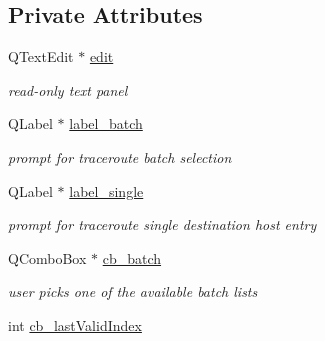 \subsection*{Private Attributes}
\begin{CompactItemize}
\item 
\hypertarget{classTraceSelectWizardPage_09f41e03b88d1b0eb7f04263587ebc3f}{
QTextEdit $\ast$ \hyperlink{classTraceSelectWizardPage_09f41e03b88d1b0eb7f04263587ebc3f}{edit}}
\label{classTraceSelectWizardPage_09f41e03b88d1b0eb7f04263587ebc3f}

\begin{CompactList}\small\item\em read-only text panel \item\end{CompactList}\item 
\hypertarget{classTraceSelectWizardPage_efc4ae411f6a3a83d13dc6b591c55ff1}{
QLabel $\ast$ \hyperlink{classTraceSelectWizardPage_efc4ae411f6a3a83d13dc6b591c55ff1}{label\_\-batch}}
\label{classTraceSelectWizardPage_efc4ae411f6a3a83d13dc6b591c55ff1}

\begin{CompactList}\small\item\em prompt for traceroute batch selection \item\end{CompactList}\item 
\hypertarget{classTraceSelectWizardPage_0e6b39a93b12ab04cec58493988f991c}{
QLabel $\ast$ \hyperlink{classTraceSelectWizardPage_0e6b39a93b12ab04cec58493988f991c}{label\_\-single}}
\label{classTraceSelectWizardPage_0e6b39a93b12ab04cec58493988f991c}

\begin{CompactList}\small\item\em prompt for traceroute single destination host entry \item\end{CompactList}\item 
\hypertarget{classTraceSelectWizardPage_4a545e13ffac35321c06b4c80dfd3cd3}{
QComboBox $\ast$ \hyperlink{classTraceSelectWizardPage_4a545e13ffac35321c06b4c80dfd3cd3}{cb\_\-batch}}
\label{classTraceSelectWizardPage_4a545e13ffac35321c06b4c80dfd3cd3}

\begin{CompactList}\small\item\em user picks one of the available batch lists \item\end{CompactList}\item 
\hypertarget{classTraceSelectWizardPage_f8655eb96839f5c311b3a69ce8800b9e}{
int \hyperlink{classTraceSelectWizardPage_f8655eb96839f5c311b3a69ce8800b9e}{cb\_\-lastValidIndex}}
\label{classTraceSelectWizardPage_f8655eb96839f5c311b3a69ce8800b9e}


\end{CompactItemize}
